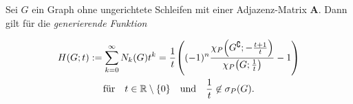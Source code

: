             \begin{proposition}

                Sei $G$ ein Graph ohne ungerichtete Schleifen mit einer Adjazenz-Matrix $\mathbf A$.
                Dann gilt für die \textit{generierende Funktion}

                \begin{multline*}
                    H(G; t)
                    :=
                    \sum_{k=0}^\infty N_k(G) t^k
                    =
                    \frac{1}{t}
                    {\left ( 
                        (-1)^n
                        \frac
                        {
                            \chi_P
                            {\left ( 
                                G^\complement;
                                -\frac{t+1}{t}
                             \right )}
                        }{
                            \chi_P
                            {\left ( 
                                G;
                                \frac{1}{t}
                             \right )}
                        }
                        -
                        1
                     \right )} \\
                    \text{für}
                    \quad
                    t \in \mathbb R \setminus {\left \{ 0 \right \}}
                    \quad
                    \text{und}
                    \quad
                    \frac{1}{t} \not \in \sigma_P(G).
                \end{multline*}

            \end{proposition}


